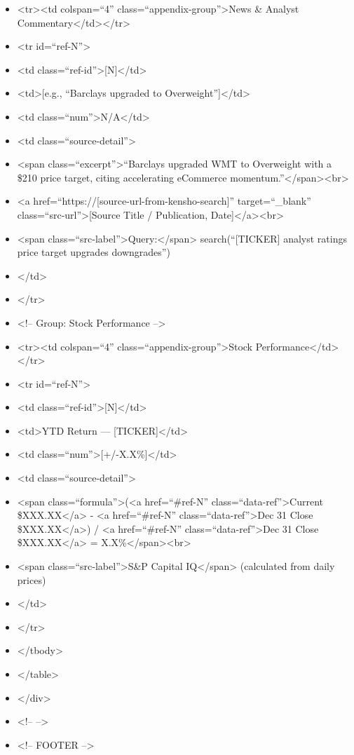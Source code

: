 \documentclass[11pt]{article}
\begin{document}
\begin{itemize}[leftmargin=*,itemsep=2pt,topsep=2pt]
\item {} <tr><td colspan=``4'' class=``appendix-group''>News \& Analyst Commentary</td></tr>
\item {} <tr id=``ref-N''>
\item {} <td class=``ref-id''>[N]</td>
\item {} <td>[e.g., ``Barclays upgraded to Overweight'']</td>
\item {} <td class=``num''>N/A</td>
\item {} <td class=``source-detail''>
\item {} <span class=``excerpt''>``Barclays upgraded WMT to Overweight with a \$210 price target, citing accelerating eCommerce momentum.''</span><br>
\item {} <a href=``https://[source-url-from-kensho-search]'' target=``\_\allowbreak{}blank'' class=``src-url''>[Source Title / Publication, Date]</a><br>
\item {} <span class=``src-label''>Query:</span> search(``[TICKER] analyst ratings price target upgrades downgrades'')
\item {} </td>
\item {} </tr>
\item {} <!-- Group: Stock Performance -->
\item {} <tr><td colspan=``4'' class=``appendix-group''>Stock Performance</td></tr>
\item {} <tr id=``ref-N''>
\item {} <td class=``ref-id''>[N]</td>
\item {} <td>YTD Return — [TICKER]</td>
\item {} <td class=``num''>[+/-X.X\%]</td>
\item {} <td class=``source-detail''>
\item {} <span class=``formula''>(<a href=``\#ref-N'' class=``data-ref''>Current \$XXX.XX</a> - <a href=``\#ref-N'' class=``data-ref''>Dec 31 Close \$XXX.XX</a>) / <a href=``\#ref-N'' class=``data-ref''>Dec 31 Close \$XXX.XX</a> = X.X\%</span><br>
\item {} <span class=``src-label''>S\&P Capital IQ</span> (calculated from daily prices)
\item {} </td>
\item {} </tr>
\item {} </tbody>
\item {} </table>
\item {} </div>
\item {} <!-- -->
\item {} <!-- FOOTER -->

\end{itemize}
\end{document}
